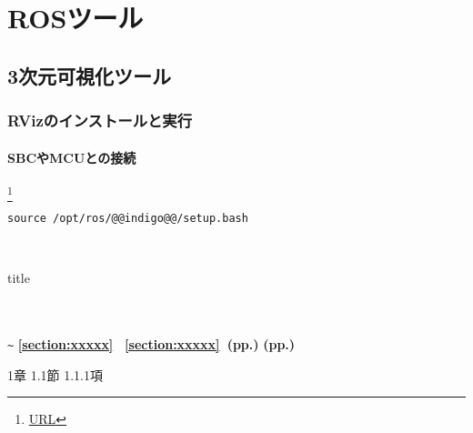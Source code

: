\vspace{\baselineskip}
\noindent
\begin{description}
\item[]
\end{description}

\chapter{ROSツール}

\section{3次元可視化ツール}

\subsection{RVizのインストールと実行}

\subsubsection{SBCやMCUとの接続}


\footnote{\url{URL}}

\tiny
\scriptsize
\footnotesize
\small
\normalsize
\large
\Large
\LARGE
\huge
\Huge

\begin{lstlisting}[moredelim={[is][keywordstyle]{@@}{@@}}]
source /opt/ros/@@indigo@@/setup.bash
\end{lstlisting}

\noindent{}\\

\begin{term}{title}
\end{term}

\begin{textbox}
\end{textbox}

\textbf{}
\\\\
\vspace{\baselineskip}
\noindent\textbf{}
\verb|~|
\label{section:xxxxx}
\textbf{\ref{section:xxxxx}}
\textbf{~\ref{section:xxxxx}~(pp.\pageref{section:xxxxx})}
\textbf{(pp.\pageref{section:terms})}

1章
1.1節
1.1.1項

